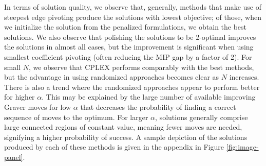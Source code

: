 \documentclass[pdflatex,sn-mathphys-num]{sn-jnl}%
\begin{document}
In terms of solution quality, we observe that, generally, methods that make use of steepest edge pivoting produce the solutions with lowest objective; of those, when we initialize the solution from the penalized formulations, we obtain the best solutions. We also observe that polishing the solutions to be 2-optimal improves the solutions in almost all cases, but the improvement is significant when using smallest coefficient pivoting (often reducing the MIP gap by a factor of 2). For small $N$, we observe that CPLEX performs comparably with the best methods, but the advantage in using randomized approaches becomes clear as $N$ increases. There is also a trend where the randomized approaches appear to perform better for higher $\alpha$. This may be explained by the large number of available improving Graver moves for low $\alpha$ that decreases the probability of finding a correct sequence of moves to the optimum. For larger $\alpha$, solutions  generally comprise large connected regions of constant value, meaning fewer moves are needed, signifying a higher probability of success.
A sample depiction of the solutions produced by each of these methods is given in the appendix in Figure \ref{fig:image-panel}.
\end{document}
